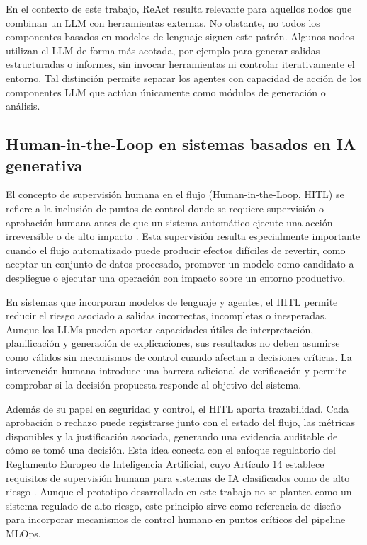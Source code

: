 \documentclass[12pt,a4paper]{article}
\theoremstyle{plain}
\begin{document}
En el contexto de este trabajo, ReAct resulta relevante para aquellos nodos que combinan un LLM con herramientas externas. No obstante, no todos los componentes basados en modelos de lenguaje siguen este patrón. Algunos nodos utilizan el LLM de forma más acotada, por ejemplo para generar salidas estructuradas o informes, sin invocar herramientas ni controlar iterativamente el entorno. Tal distinción permite separar los agentes con capacidad de acción de los componentes LLM que actúan únicamente como módulos de generación o análisis.

\subsection{Human-in-the-Loop en sistemas basados en IA generativa}
\label{sec:hitl}

El concepto de supervisión humana en el flujo (Human-in-the-Loop, HITL) se refiere a la inclusión de puntos de control donde se requiere supervisión o aprobación humana antes de que un sistema automático ejecute una acción irreversible o de alto impacto \cite{eu_ai_act}. Esta supervisión resulta especialmente importante cuando el flujo automatizado puede producir efectos difíciles de revertir, como aceptar un conjunto de datos procesado, promover un modelo como candidato a despliegue o ejecutar una operación con impacto sobre un entorno productivo.
 
En sistemas que incorporan modelos de lenguaje y agentes, el HITL permite reducir el riesgo asociado a salidas incorrectas, incompletas o inesperadas. Aunque los LLMs pueden aportar capacidades útiles de interpretación, planificación y generación de explicaciones, sus resultados no deben asumirse como válidos sin mecanismos de control cuando afectan a decisiones críticas. La intervención humana introduce una barrera adicional de verificación y permite comprobar si la decisión propuesta responde al objetivo del sistema.

Además de su papel en seguridad y control, el HITL aporta trazabilidad. Cada aprobación o rechazo puede registrarse junto con el estado del flujo, las métricas disponibles y la justificación asociada, generando una evidencia auditable de cómo se tomó una decisión. Esta idea conecta con el enfoque regulatorio del Reglamento Europeo de Inteligencia Artificial, cuyo Artículo 14 establece requisitos de supervisión humana para sistemas de IA clasificados como de alto riesgo \cite{eu_ai_act}. Aunque el prototipo desarrollado en este trabajo no se plantea como un sistema regulado de alto riesgo, este principio sirve como referencia de diseño para incorporar mecanismos de control humano en puntos críticos del pipeline MLOps.
\end{document}
